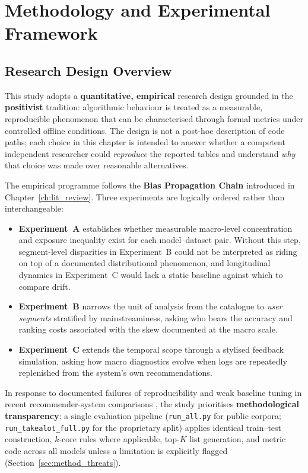\chapter{Methodology and Experimental Framework}
\label{ch:methodology}

\section{Research Design Overview}
\label{sec:method_overview}

This study adopts a \textbf{quantitative, empirical} research design grounded in the \textbf{positivist} tradition: algorithmic behaviour is treated as a measurable, reproducible phenomenon that can be characterised through formal metrics under controlled offline conditions. The design is not a post-hoc description of code paths; each choice in this chapter is intended to answer whether a competent independent researcher could \emph{reproduce} the reported tables and understand \emph{why} that choice was made over reasonable alternatives.

The empirical programme follows the \textbf{Bias Propagation Chain} introduced in Chapter~\ref{ch:lit_review}. Three experiments are logically ordered rather than interchangeable:
\begin{itemize}
  \item \textbf{Experiment~A} establishes whether measurable macro-level concentration and exposure inequality exist for each model--dataset pair. Without this step, segment-level disparities in Experiment~B could not be interpreted as riding on top of a documented distributional phenomenon, and longitudinal dynamics in Experiment~C would lack a static baseline against which to compare drift.
  \item \textbf{Experiment~B} narrows the unit of analysis from the catalogue to \emph{user segments} stratified by mainstreaminess, asking who bears the accuracy and ranking costs associated with the skew documented at the macro scale.
  \item \textbf{Experiment~C} extends the temporal scope through a stylised feedback simulation, asking how macro diagnostics evolve when logs are repeatedly replenished from the system's own recommendations.
\end{itemize}

In response to documented failures of reproducibility and weak baseline tuning in recent recommender-system comparisons \citep{ferrari2019progress}, the study prioritises \textbf{methodological transparency}: a single evaluation pipeline (\texttt{run\_all.py} for public corpora; \texttt{run\_takealot\_full.py} for the proprietary split) applies identical train--test construction, $k$-core rules where applicable, top-$K$ list generation, and metric code across all models unless a limitation is explicitly flagged (Section~\ref{sec:method_threats}).

